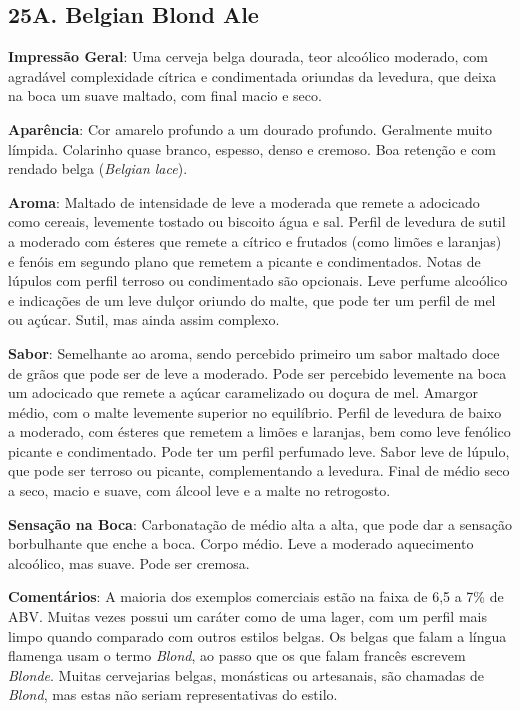 \subsection*{25A. Belgian Blond Ale}
\textbf{Impressão Geral}: Uma cerveja belga dourada, teor alcoólico moderado, com agradável complexidade cítrica e condimentada oriundas da levedura, que deixa na boca um suave maltado, com final macio e seco.

\textbf{Aparência}: Cor amarelo profundo a um dourado profundo. Geralmente muito límpida. Colarinho quase branco, espesso, denso e cremoso. Boa retenção e com rendado belga (\textit{Belgian lace}).

\textbf{Aroma}: Maltado de intensidade de leve a moderada que remete a adocicado como cereais, levemente tostado ou biscoito água e sal. Perfil de levedura de sutil a moderado com ésteres que remete a cítrico e frutados (como limões e laranjas) e fenóis em segundo plano que remetem a picante e condimentados. Notas de lúpulos com perfil terroso ou condimentado são opcionais. Leve perfume alcoólico e indicações de um leve dulçor oriundo do malte, que pode ter um perfil de mel ou açúcar. Sutil, mas ainda assim complexo.

\textbf{Sabor}: Semelhante ao aroma, sendo percebido primeiro um sabor maltado doce de grãos que pode ser de leve a moderado. Pode ser percebido levemente na boca um adocicado que remete a açúcar caramelizado ou doçura de mel. Amargor médio, com o malte levemente superior no equilíbrio. Perfil de levedura de baixo a moderado, com ésteres que remetem a limões e laranjas, bem como leve fenólico picante e condimentado. Pode ter um perfil perfumado leve. Sabor leve de lúpulo, que pode ser terroso ou picante, complementando a levedura. Final de médio seco a seco, macio e suave, com álcool leve e a malte no retrogosto.

\textbf{Sensação na Boca}: Carbonatação de médio alta a alta, que pode dar a sensação borbulhante que enche a boca. Corpo médio. Leve a moderado aquecimento alcoólico, mas suave. Pode ser cremosa.

\textbf{Comentários}: A maioria dos exemplos comerciais estão na faixa de 6,5 a 7\% de ABV. Muitas vezes possui um caráter como de uma lager, com um perfil mais limpo quando comparado com outros estilos belgas. Os belgas que falam a língua flamenga usam o termo \textit{Blond}, ao passo que os que falam francês escrevem \textit{Blonde}. Muitas cervejarias belgas, monásticas ou artesanais, são chamadas de \textit{Blond}, mas estas não seriam representativas do estilo.


